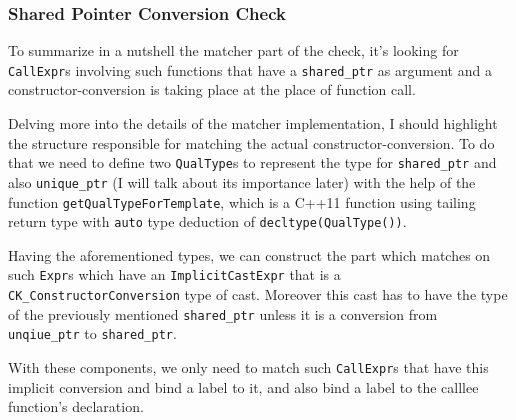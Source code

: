 \subsubsection{Shared Pointer Conversion Check}
\par To summarize in a nutshell the matcher part of the check, it's looking for \verb|CallExpr|s involving such functions that have a \verb|shared_ptr| as argument and a constructor-conversion is taking place at the place of function call. \medskip
\par Delving more into the details of the matcher implementation, I should highlight the structure responsible for matching the actual constructor-conversion. To do that we need to define two \verb|QualType|s to represent the type for \verb|shared_ptr| and also \verb|unique_ptr| (I will talk about its importance later) with the help of the function \verb|getQualTypeForTemplate|, which is a C++11 function using tailing return type with \verb|auto| type deduction of \verb|decltype(QualType())|. \medskip
\par Having the aforementioned types, we can construct the part which matches on such \verb|Expr|s which have an \verb|ImplicitCastExpr| that is a \verb|CK_ConstructorConversion| type of cast. Moreover this cast has to have the type of the previously mentioned \verb|shared_ptr| unless it is a conversion from \verb|unqiue_ptr| to \verb|shared_ptr|. \medskip
\par With these components, we only need to match such \verb|CallExpr|s that have this implicit conversion and bind a label to it, and also bind a label to the calllee function's declaration.
